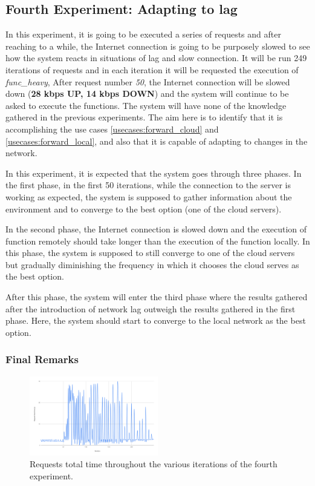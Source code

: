 \documentclass[conference]{IEEEtran}
\begin{document}
\subsection{Fourth Experiment: Adapting to lag}
\label{res:exp4}
In this experiment, it is going to be executed a series of requests and after
reaching to a while, the Internet connection is going to be purposely slowed to
see how the system reacts in situations of lag and slow connection. It will be run
249 iterations of requests and in each iteration it will be requested the
execution of \textit{func\_heavy}, After request number \textit{50}, the Internet
connection will be slowed down (\textbf{28 kbps UP, 14 kbps DOWN}) and the system
will continue to be asked to execute the functions. The system will have none of
the knowledge gathered in the previous experiments. The aim here is to identify
that it is accomplishing the use cases \ref{usecases:forward_cloud} and
\ref{usecases:forward_local}, and also that it is capable of adapting to changes
in the network.

In this experiment, it is expected that the system goes through three phases. In
the first phase, in the first 50 iterations, while the connection to the server is
working as expected, the system is supposed to gather information about the
environment and to converge to the best option (one of the cloud servers).

In the second phase, the Internet connection is slowed down and the execution of
function remotely should take longer than the execution of the function locally.
In this phase, the system is supposed to still converge to one of the cloud
servers but gradually diminishing the frequency in which it chooses the cloud
serves as the best option.

After this phase, the system will enter the third phase where the results gathered
after the introduction of network lag outweigh the results gathered in the first
phase. Here, the system should start to converge to the local network as the
best option.


\subsubsection{Final Remarks}

\begin{figure}[h]
  \begin{center}
    \includegraphics[width=0.5\textwidth]{exp4_total_time_chart.png}
    \caption{Requests total time throughout the various iterations of the
    fourth experiment.}
    \label{fig:exp4_total_time_chart}
  \end{center}
\end{figure}
\end{document}
